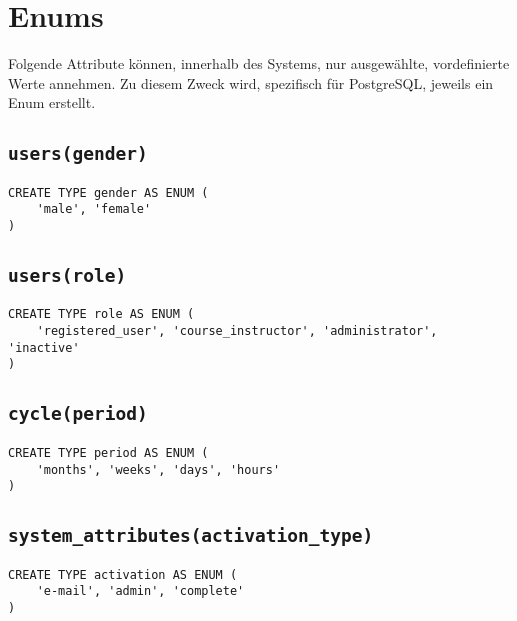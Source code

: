 \section{Enums}
Folgende Attribute können, innerhalb des Systems, nur ausgewählte, vordefinierte Werte annehmen. Zu diesem Zweck wird, spezifisch für PostgreSQL, jeweils ein Enum erstellt.

\subsection{\texttt{users(gender)}}

\begin{verbatim}
CREATE TYPE gender AS ENUM (
	'male', 'female'
)
\end{verbatim}

\subsection{\texttt{users(role)}}

\begin{verbatim}
CREATE TYPE role AS ENUM (
	'registered_user', 'course_instructor', 'administrator', 	'inactive'
)
\end{verbatim}

\subsection{\texttt{cycle(period)}}

\begin{verbatim}
CREATE TYPE period AS ENUM (
	'months', 'weeks', 'days', 'hours'
)
\end{verbatim}

\subsection{\texttt{system\_attributes(activation\_type)}}

\begin{verbatim}
CREATE TYPE activation AS ENUM (
	'e-mail', 'admin', 'complete'
)
\end{verbatim}
